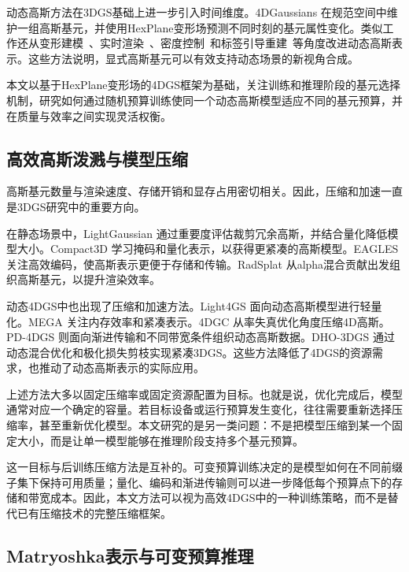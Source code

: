\documentclass[sn-mathphys]{sn-jnl}
\begin{document}
动态高斯方法在3DGS基础上进一步引入时间维度。4DGaussians \cite{wu20244dgaussians} 在规范空间中维护一组高斯基元，并使用HexPlane变形场预测不同时刻的基元属性变化。类似工作还从变形建模~\cite{yang2024deformable3dgs,duan20244drotor}、实时渲染~\cite{yang2024realtime4dgs}、密度控制~\cite{cao2026spatiogs}和标签引导重建~\cite{wang2026label4dgs}等角度改进动态高斯表示。这些方法说明，显式高斯基元可以有效支持动态场景的新视角合成。

本文以基于HexPlane变形场的4DGS框架为基础，关注训练和推理阶段的基元选择机制，研究如何通过随机预算训练使同一个动态高斯模型适应不同的基元预算，并在质量与效率之间实现灵活权衡。

\subsection{高效高斯泼溅与模型压缩}

高斯基元数量与渲染速度、存储开销和显存占用密切相关。因此，压缩和加速一直是3DGS研究中的重要方向。

在静态场景中，LightGaussian \cite{fan2024lightgaussian} 通过重要度评估裁剪冗余高斯，并结合量化降低模型大小。Compact3D \cite{lee2024compact3d} 学习掩码和量化表示，以获得更紧凑的高斯模型。EAGLES \cite{girish2024eagles} 关注高效编码，使高斯表示更便于存储和传输。RadSplat \cite{niemeyer2024radsplat} 从alpha混合贡献出发组织高斯基元，以提升渲染效率。

动态4DGS中也出现了压缩和加速方法。Light4GS \cite{liu2025light4gs} 面向动态高斯模型进行轻量化。MEGA \cite{zhang2025mega} 关注内存效率和紧凑表示。4DGC \cite{hu20254dgc} 从率失真优化角度压缩4D高斯。PD-4DGS \cite{li2025pd4dgs} 则面向渐进传输和不同带宽条件组织动态高斯数据。DHO-3DGS \cite{zhang2026dho3dgs} 通过动态混合优化和极化损失剪枝实现紧凑3DGS。这些方法降低了4DGS的资源需求，也推动了动态高斯表示的实际应用。

上述方法大多以固定压缩率或固定资源配置为目标。也就是说，优化完成后，模型通常对应一个确定的容量。若目标设备或运行预算发生变化，往往需要重新选择压缩率，甚至重新优化模型。本文研究的是另一类问题：不是把模型压缩到某一个固定大小，而是让单一模型能够在推理阶段支持多个基元预算。

这一目标与后训练压缩方法是互补的。可变预算训练决定的是模型如何在不同前缀子集下保持可用质量；量化、编码和渐进传输则可以进一步降低每个预算点下的存储和带宽成本。因此，本文方法可以视为高效4DGS中的一种训练策略，而不是替代已有压缩技术的完整压缩框架。

\subsection{Matryoshka表示与可变预算推理}
\end{document}
